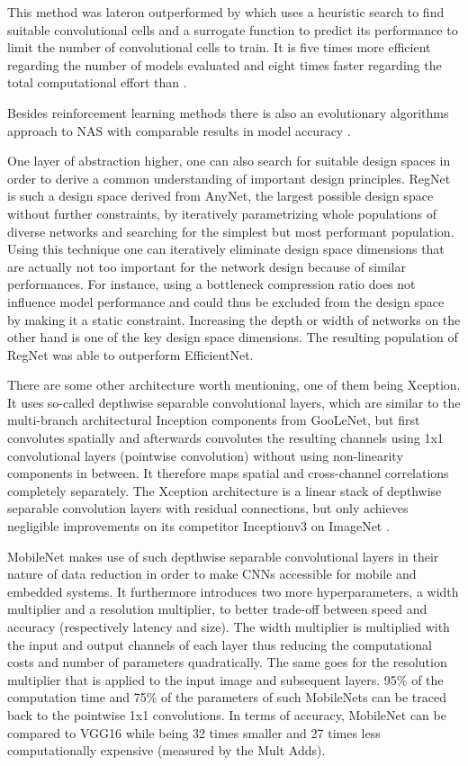 This method was lateron outperformed by \cite{ChenxiLiu.2018} which uses a heuristic search to find suitable convolutional cells and a surrogate function to predict its performance to limit the number of convolutional cells to train. It is five times more efficient regarding the number of models evaluated and eight times faster regarding the total computational effort than \cite{BarretZoph.2018}. 

Besides reinforcement learning methods there is also an evolutionary algorithms approach to NAS with comparable results in model accuracy \cite{EstebanReal.2019}.

One layer of abstraction higher, one can also search for suitable design spaces in order to derive a common understanding of important design principles. RegNet is such a design space derived from AnyNet, the largest possible design space without further constraints, by iteratively parametrizing whole populations of diverse networks and searching for the simplest but most performant population. Using this technique one can iteratively eliminate design space dimensions that are actually not too important for the network design because of similar performances. For instance, using a bottleneck compression ratio does not influence model performance and could thus be excluded from the design space by making it a static constraint. Increasing the depth or width of networks on the other hand is one of the key design space dimensions. The resulting population of RegNet was able to outperform EfficientNet. \cite{IlijaRadosavovic.2020}

There are some other architecture worth mentioning, one of them being Xception. It uses so-called depthwise separable convolutional layers, which are similar to the multi-branch architectural Inception components from GooLeNet, but first convolutes spatially and afterwards convolutes the resulting channels using 1x1 convolutional layers (pointwise convolution) without using non-linearity components in between. It therefore maps spatial and cross-channel correlations completely separately. The Xception architecture is a linear stack of depthwise separable convolution layers with residual connections, but only achieves negligible improvements on its competitor Inceptionv3 on ImageNet \cite{JiaDeng.2009}. \cite{FrancoisChollet.2017}

MobileNet makes use of such depthwise separable convolutional layers in their nature of data reduction in order to make CNNs accessible for mobile and embedded systems. It furthermore introduces two more hyperparameters, a width multiplier and a resolution multiplier, to better trade-off between speed and accuracy (respectively latency and size). The width multiplier is multiplied with the input and output channels of each layer thus reducing the computational costs and number of parameters quadratically. The same goes for the resolution multiplier that is applied to the input image and subsequent layers. 95\% of the computation time and 75\% of the parameters of such MobileNets can be traced back to the pointwise 1x1 convolutions. In terms of accuracy, MobileNet can be compared to VGG16 while being 32 times smaller and 27 times less computationally expensive (measured by the Mult Adds). \cite{AndrewGHoward.2017}

